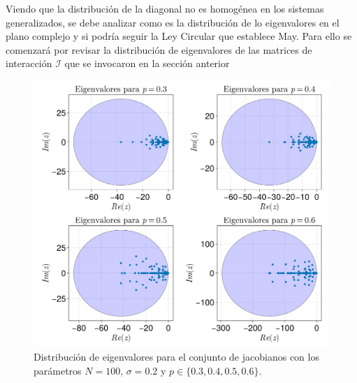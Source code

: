 Viendo que la distribución de la diagonal no es homogénea en los sistemas generalizados, se debe analizar como es la distribución de lo eigenvalores en el plano complejo y si podría seguir la Ley Circular que establece May. Para ello se comenzará por revisar la distribución de eigenvalores de las matrices de interacción $\mathcal{I}$ que se invocaron en la sección anterior
\begin{figure}[h!]
	\centering
	\includegraphics[scale=0.24]{../Imagenes/DistEigenvalores}
	\caption{Distribución de eigenvalores para el conjunto de jacobianos con los parámetros $N=100$, $\sigma=0.2$ y $p\in\{0.3,0.4,0.5,0.6\}$.}
	\label{fig:DistEigenvalores}
\end{figure}

